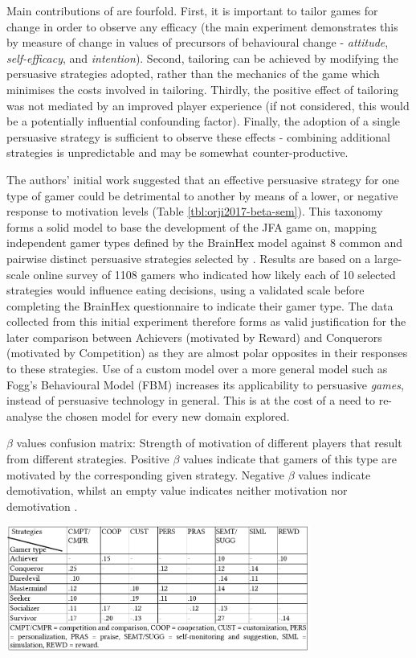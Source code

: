 \documentclass[11pt]{article}
\begin{document}
Main contributions of \citet{orji2017} are fourfold. First, it is important to tailor games for change in order to observe any efficacy (the main experiment demonstrates this by measure of change in values of precursors of behavioural change - \textit{attitude}, \textit{self-efficacy}, and \textit{intention}). Second, tailoring can be achieved by modifying the persuasive strategies adopted, rather than the mechanics of the game which minimises the costs involved in tailoring. Thirdly, the positive effect of tailoring was not mediated by an improved player experience (if not considered, this would be a potentially influential confounding factor). Finally, the adoption of a single persuasive strategy is sufficient to observe these effects - combining additional strategies is unpredictable and may be somewhat counter-productive.

The authors' initial work suggested that an effective persuasive strategy for one type of gamer could be detrimental to another by means of a lower, or negative response to motivation levels \citep{orji2013a} (Table \ref{tbl:orji2017-beta-sem}). This taxonomy forms a solid model to base the development of the JFA game on, mapping independent gamer types defined by the BrainHex model \citep{nacke2014} against 8 common and pairwise distinct persuasive strategies selected by \citet{gerling2014}. Results are based on a large-scale online survey of 1108 gamers who indicated how likely each of 10 selected strategies would influence eating decisions, using a validated scale \citep{drozd2012} before completing the BrainHex questionnaire to indicate their gamer type. The data collected from this initial experiment therefore forms as valid justification for the later comparison between Achievers (motivated by Reward) and Conquerors (motivated by Competition) as they are almost polar opposites in their responses to these strategies. Use of a custom model over a more general model such as Fogg's Behavioural Model (FBM) \citep{fogg2002} increases its applicability to persuasive \textit{games}, instead of persuasive technology in general. This is at the cost of a need to re-analyse the chosen model for every new domain explored.

\begin{table}[H]
\centering
\caption{$\beta$ values confusion matrix: Strength of motivation of different players that result from different strategies. Positive $\beta$ values indicate that gamers of this type are motivated by the corresponding given strategy. Negative $\beta$ values indicate demotivation, whilst an empty value indicates neither motivation nor demotivation \protect\citep{orji2013a}.
}\label{tbl:orji2017-beta-sem}
\includegraphics[width=0.75\textwidth]{img/orji2017-beta-sem.png} 
\end{table}
\end{document}
